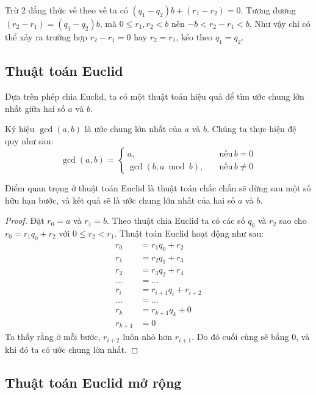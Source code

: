 \documentclass{mynotes}
\begin{document}
Trừ 2 đẳng thức vế theo vế ta có $(q_1 - q_2) b + (r_1 - r_2) = 0$. Tương đương $(r_2 - r_1) = (q_1 - q_2) b$, mà $0 \leqslant r_1, r_2 < b$ nên $-b < r_2 - r_1 < b$. Như vậy chỉ có thể xảy ra trường hợp
$r_2 - r_1 = 0$ hay $r_2 = r_1$, kéo theo $q_1 = q_2$.

\subsection*{Thuật toán Euclid}

Dựa trên phép chia Euclid, ta có một thuật toán hiệu quả để tìm ước chung lớn nhất giữa hai số $a$ và $b$.

Ký hiệu $\gcd(a, b)$ là ước chung lớn nhất của $a$ và $b$. Chúng  ta thực hiện đệ quy như sau:
\begin{equation*}
    \gcd(a, b) = \begin{cases}
        a, \quad & \text{nếu}\,b = 0 \\
        \gcd(b, a \bmod b), \quad & \text{nếu}\,b \neq 0
    \end{cases} 
\end{equation*}

Điểm quan trọng ở thuật toán Euclid là thuật toán chắc chắn sẽ dừng sau một số hữu hạn bước, và kết quả sẽ là ước chung lớn nhất của hai số $a$ và $b$.

\begin{proof}
    Đặt $r_0 = a$ và $r_1 = b$. Theo thuật chia Euclid ta có các số $q_0$ và $r_2$ sao cho $r_0 = r_1 q_0 + r_2$ với $0 \leqslant r_2 < r_1$. Thuật toán Euclid hoạt động như sau:
    \begin{align*}
        r_0 & = r_1 q_0 + r_2 \\
        r_1 & = r_2 q_1 + r_3 \\
        r_2 & = r_3 q_2 + r_4 \\
        \ldots & = \ldots \\
        r_i & = r_{i+1} q_i + r_{i+2} \\
        \ldots & = \ldots \\
        r_k & = r_{k+1} q_k + 0 \\
        r_{k+1} & = 0
    \end{align*}
    Ta thấy rằng ở mỗi bước, $r_{i+2}$ luôn nhỏ hơn $r_{i+1}$. Do đó cuối cùng sẽ bằng 0, và khi đó ta có ước chung lớn nhất.
\end{proof}

\subsection*{Thuật toán Euclid mở rộng}
\end{document}
